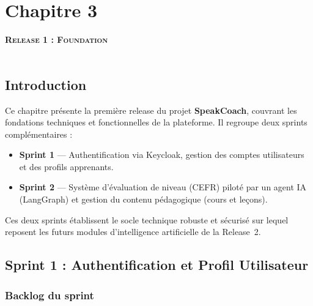 \chapter*{Chapitre 3}
\textsc{\textbf{\Huge Release 1 : Foundation}} \\ \\
\setcounter{chapter}{3}
\setcounter{section}{0}

\section{Introduction}

Ce chapitre présente la première release du projet \textbf{SpeakCoach}, couvrant les fondations
techniques et fonctionnelles de la plateforme. Il regroupe deux sprints complémentaires :

\begin{itemize}
    \item \textbf{Sprint 1} --- Authentification via Keycloak, gestion des
          comptes utilisateurs et des profils apprenants.
    \item \textbf{Sprint 2} --- Système d'évaluation de niveau (CEFR) piloté par un agent IA (LangGraph) 
          et gestion du contenu pédagogique (cours et leçons).
\end{itemize}

Ces deux sprints établissent le socle technique robuste et sécurisé sur lequel reposent les futurs modules d'intelligence
artificielle de la Release~2.

\section{Sprint 1 : Authentification et Profil Utilisateur}

\subsection{Backlog du sprint}


